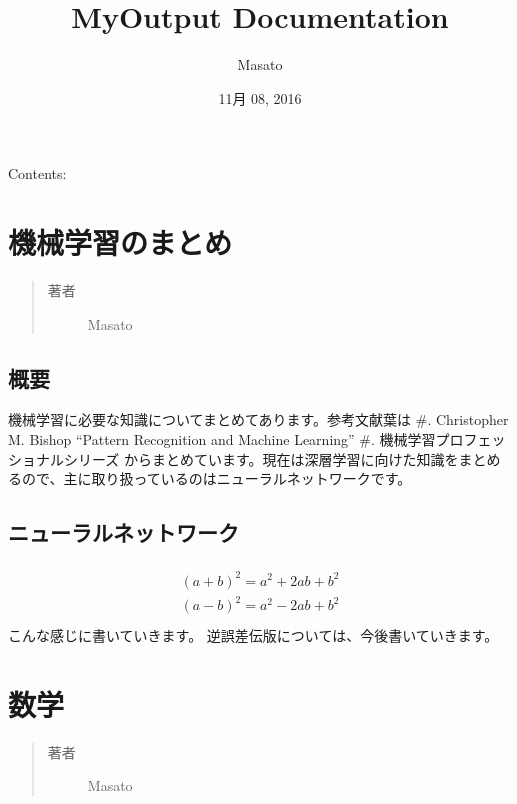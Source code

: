 \documentclass[letterpaper,10pt,dvipdfmx]{sphinxmanual}
\title{MyOutput Documentation}
\date{11月 08, 2016}
\author{Masato}
\begin{document}
\maketitle
\tableofcontents
{}\label{index::doc}


Contents:


\chapter{機械学習のまとめ}
\label{learned_machine_learning:id1}\label{learned_machine_learning::doc}\label{learned_machine_learning:welcome-to-myoutput-s-documentation}\begin{quote}\begin{description}
\item[{著者}] \leavevmode
Masato

\end{description}\end{quote}


\section{概要}
\label{learned_machine_learning:id2}
機械学習に必要な知識についてまとめてあります。参考文献葉は
\#. Christopher M. Bishop ``Pattern Recognition and Machine Learning''
\#. 機械学習プロフェッショナルシリーズ
からまとめています。現在は深層学習に向けた知識をまとめるので、主に取り扱っているのはニューラルネットワークです。


\section{ニューラルネットワーク}
\label{learned_machine_learning:id3}\begin{align*}\!\begin{aligned}
(a + b)^2 = a^2 + 2ab + b^2\\
(a - b)^2 = a^2 - 2ab + b^2\\
\end{aligned}\end{align*}
こんな感じに書いていきます。
逆誤差伝版については、今後書いていきます。


\chapter{数学}
\label{learned_math:id1}\label{learned_math::doc}\begin{quote}\begin{description}
\item[{著者}] \leavevmode
Masato

\end{description}\end{quote}
\end{document}
